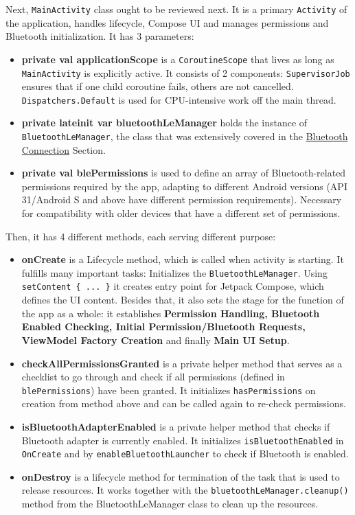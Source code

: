 Next, \texttt{MainActivity} class ought to be reviewed next. It is a primary \texttt{Activity} of the application, handles lifecycle, Compose \ac{UI} and manages permissions and Bluetooth initialization.
It has 3 parameters:
\begin{itemize}
	\item \textbf{private val applicationScope} is a \texttt{CoroutineScope} that lives as long as \texttt{MainActivity} is explicitly active. It consists of 2 components: \texttt{SupervisorJob} ensures that if one child coroutine fails, others are not cancelled. \texttt{Dispatchers.Default} is used for CPU-intensive work off the main thread.
	\item \textbf{private lateinit var bluetoothLeManager} holds the instance of \texttt{BluetoothLeManager}, the class that was extensively covered in the \hyperref[subsec:Bluetooth]{Bluetooth Connection} Section.
	\item \textbf{private val blePermissions} is used to define an array of Bluetooth-related permissions required by the app, adapting to different Android versions (API 31/Android S and above have different permission requirements). Necessary for compatibility with older devices that have a different set of permissions.
\end{itemize}
Then, it has 4 different methods, each serving different purpose:
\begin{itemize}
	\item \textbf{onCreate} is a Lifecycle method, which is called when activity is starting. It fulfills many important tasks: Initializes the \texttt{BluetoothLeManager}. Using \texttt{setContent \{ ... \}} it creates entry point for Jetpack Compose, which defines the UI content. Besides that, it also sets the stage for the function of the app as a whole: it establishes \textbf{Permission Handling, Bluetooth Enabled Checking, Initial Permission/Bluetooth Requests, ViewModel Factory Creation} and finally \textbf{Main UI Setup}. 
	\item \textbf{checkAllPermissionsGranted} is a private helper method  that serves as a checklist to go through and check if all permissions (defined in \texttt{blePermissions}) have been granted. It initializes \texttt{hasPermissions} on creation from method above and can be called again to re-check permissions.
	\item \textbf{isBluetoothAdapterEnabled} is a private helper method that checks if Bluetooth adapter is currently enabled. It initializes \texttt{isBluetoothEnabled} in \texttt{OnCreate} and by \texttt{enableBluetoothLauncher} to check if Bluetooth is enabled.
	\item \textbf{onDestroy} is a lifecycle method for termination of the task that is used to release resources. It works together with the \texttt{bluetoothLeManager.cleanup()} method from the BluetoothLeManager class to clean up  the resources.
\end{itemize}
